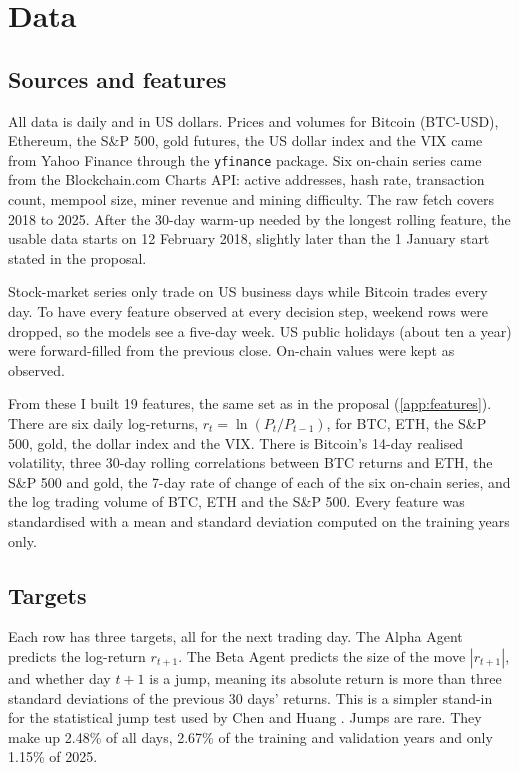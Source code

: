 \section{Data}\label{sec:data}

\subsection{Sources and features}

All data is daily and in US dollars. Prices and volumes for Bitcoin (BTC-USD), Ethereum, the S\&P 500, gold futures, the US dollar index and the VIX came from Yahoo Finance through the \texttt{yfinance} package. Six on-chain series came from the Blockchain.com Charts API: active addresses, hash rate, transaction count, mempool size, miner revenue and mining difficulty. The raw fetch covers 2018 to 2025. After the 30-day warm-up needed by the longest rolling feature, the usable data starts on 12 February 2018, slightly later than the 1 January start stated in the proposal.

Stock-market series only trade on US business days while Bitcoin trades every day. To have every feature observed at every decision step, weekend rows were dropped, so the models see a five-day week. US public holidays (about ten a year) were forward-filled from the previous close. On-chain values were kept as observed.

From these I built 19 features, the same set as in the proposal (\cref{app:features}). There are six daily log-returns, $r_t=\ln(P_t/P_{t-1})$, for BTC, ETH, the S\&P 500, gold, the dollar index and the VIX. There is Bitcoin's 14-day realised volatility, three 30-day rolling correlations between BTC returns and ETH, the S\&P 500 and gold, the 7-day rate of change of each of the six on-chain series, and the log trading volume of BTC, ETH and the S\&P 500. Every feature was standardised with a mean and standard deviation computed on the training years only.

\subsection{Targets}

Each row has three targets, all for the next trading day. The Alpha Agent predicts the log-return $r_{t+1}$. The Beta Agent predicts the size of the move $|r_{t+1}|$, and whether day $t+1$ is a jump, meaning its absolute return is more than three standard deviations of the previous 30 days' returns. This is a simpler stand-in for the statistical jump test used by Chen and Huang \cite{chen2021jump}. Jumps are rare. They make up 2.48\% of all days, 2.67\% of the training and validation years and only 1.15\% of 2025.

